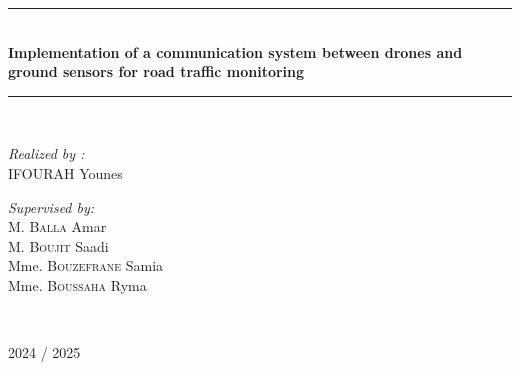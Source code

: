 {\begin{titlepage}
    \rule{\linewidth}{0.3mm} \\[0.4cm]
    {
    \Large \bfseries
    Implementation of a communication system between drones and ground sensors for road traffic monitoring
    }
    \rule{\linewidth}{0.3mm} \\[1cm]

    \vspace{10mm}

    \noindent
    \begin{minipage}{0.6\textwidth}
      \vspace{-7mm}
      \begin{flushleft} \large
        \emph{Realized by :}\\
        \textsc{IFOURAH} Younes \\
      \end{flushleft}
    \end{minipage}
    \begin{minipage}{0.35\textwidth}
      \begin{flushright} \large
        \begin{flushleft} \large
          \emph{Supervised by:} \\
          {
          M. \textsc{Balla} Amar\\[0.1cm]
          M. \textsc{Boujit} Saadi\\[0.1cm]
          Mme. \textsc{Bouzefrane} Samia\\[0.1cm]
          Mme. \textsc{Boussaha} Ryma\\[0.1cm]
          }
        \end{flushleft}
      \end{flushright}
    \end{minipage}\\[1cm]


    \vfill

    {\large 2024 / 2025}
  \end{titlepage}
  \restoregeometry
}